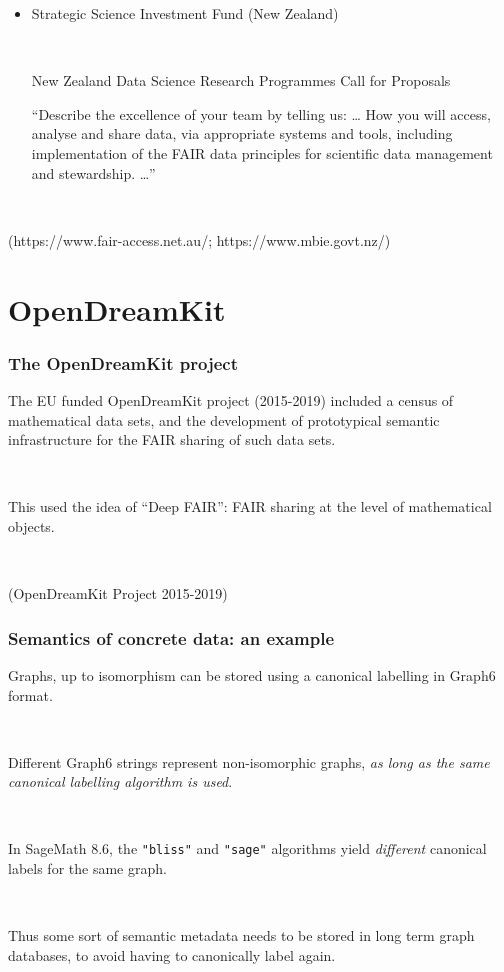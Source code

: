 \documentclass[pdf,sprung,slideColor,nocolorBG]{beamer}
\newenvironment{colortheme}[1]{
\def\ProvidesPackageRCS $##1${\relax}
\renewcommand{\ProcessOptions}{\relax}
\makeatletter

\makeatother
}{}
\newcommand{\slidecite}[1]{\tiny{(#1)}\normalsize{}}
\begin{document}
\begin{colortheme}{jubata}
\begin{frame}
\begin{itemize}
~

\item
Strategic Science Investment Fund (New Zealand)

~

\footnotesize
New Zealand Data Science Research Programmes Call for Proposals


``Describe the excellence of your team by telling us: \ldots
How you will access, analyse and share data, via
appropriate systems and tools, including implementation of
the FAIR data principles for scientific data management and
stewardship. \ldots''

\end{itemize}

~

\slidecite{https://www.fair-access.net.au/; https://www.mbie.govt.nz/}
\end{frame}
\section{OpenDreamKit}
\begin{frame}
\frametitle{The OpenDreamKit project}

The EU funded OpenDreamKit project (2015-2019) included a census of mathematical data sets, 
and the development of prototypical semantic infrastructure for the FAIR sharing of such data sets.

~

This used the idea of ``Deep FAIR'': FAIR sharing at the level of mathematical objects.

~

\slidecite{OpenDreamKit Project 2015-2019}
\end{frame}
\begin{frame}
\frametitle{Semantics of concrete data: an example}

Graphs, up to isomorphism can be stored using a canonical labelling in Graph6 format.

~

Different Graph6 strings represent non-isomorphic graphs, 
\emph{as long as the same canonical labelling algorithm is used}.

~

In SageMath 8.6, the \texttt{"bliss"} and \texttt{"sage"} algorithms yield \emph{different}
canonical labels for the same graph.

~

Thus some sort of semantic metadata needs to be stored in long term graph databases,
to avoid having to canonically label again.


\end{frame}
\end{colortheme}
\end{document}
